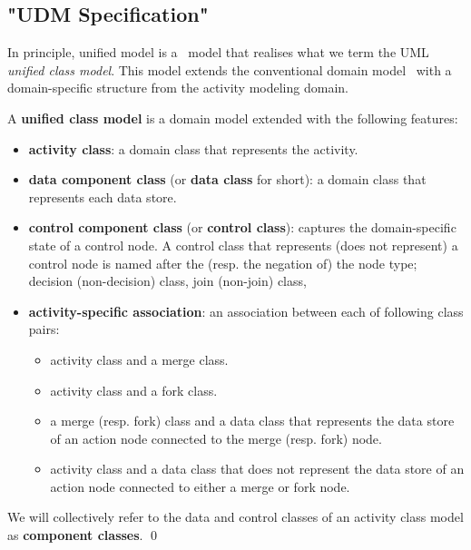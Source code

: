 \subsection{"UDM Specification"}

In principle, unified model is a \dcsl~model that realises what we term the UML \textit{unified class model}. This model extends the conventional domain model~\cite{evans_domain-driven_2004} with a domain-specific structure from the activity modeling domain.
%
\begin{definition} \label{def:unified-class-model}
	A \textbf{unified class model} is a domain model extended with the following features:
	
	\begin{itemize}%
		\item \textbf{activity class}: a domain class that represents the activity.
		\item \textbf{data component class} (or \textbf{data class} for short): a domain class that represents each data store.
		\item \textbf{control component class} (or \textbf{control class}): captures the domain-specific state of a control node. A control class that represents (does not represent) a control node is named after the (resp. the negation of) the node type; \eg decision (non-decision) class, join (non-join) class, \etc
		\item \textbf{activity-specific association}: an association between each of following class pairs:
		\begin{itemize}
			\item activity class and a merge class.
			\item activity class and a fork class.
			\item a merge (resp. fork) class and a data class that represents the data store of an action node connected to the merge (resp. fork) node.
			\item activity class and a data class that does not represent the data store of an action node connected to either a merge or fork node.
		\end{itemize}        	
	\end{itemize}
	We will collectively refer to the data and control classes of an activity class model as \textbf{component classes}. \qed
\end{definition}

